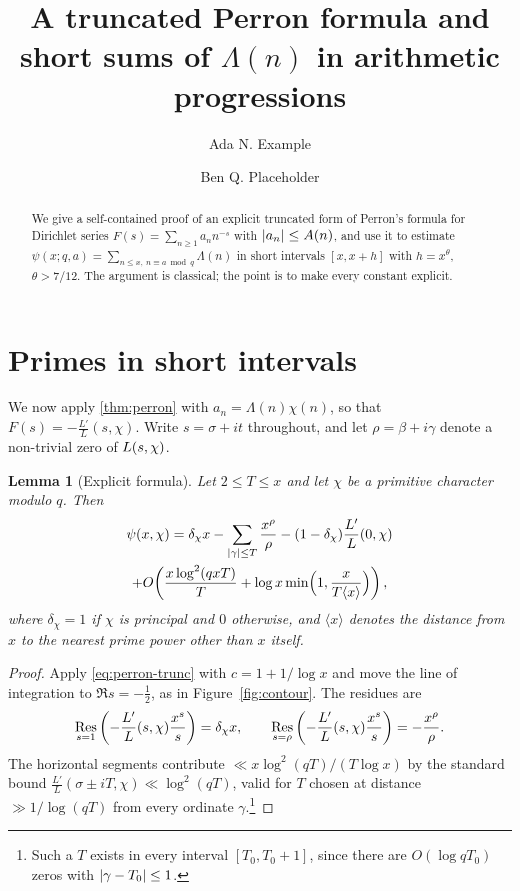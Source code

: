 \documentclass[11pt]{amsart}
\title[Truncated Perron formulae]{A truncated Perron formula and \\ short sums of $\Lambda(n)$ in arithmetic progressions}
\author{Ada N. Example}
\author{Ben Q. Placeholder}
\numberwithin{equation}{section}
\theoremstyle{plain}
\newtheorem{lemma}[theorem]{Lemma}
\theoremstyle{definition}
\theoremstyle{remark}
\begin{document}
\begin{abstract}
We give a self-contained proof of an explicit truncated form of Perron's formula
for Dirichlet series $F(s)=\sum_{n\ge1}a_n n^{-s}$ with $\lvert a_n\rvert\le A(n)$, and use it to
estimate $\psi(x;q,a)=\sum_{n\le x,\ n\equiv a \bmod q}\Lambda(n)$ in short intervals
$[x, x+h]$ with $h = x^{\theta}$, $\theta>7/12$. The argument is classical; the point is to make
every constant explicit.
\end{abstract}

\maketitle




\section{Primes in short intervals}\label{sec:short}

We now apply \cref{thm:perron} with $a_n=\Lambda(n)\chi(n)$, so that
$F(s)=-\frac{L'}{L}(s,\chi)$. Write $s=\sigma+it$ throughout, and let $\rho=\beta+i\gamma$
denote a non-trivial zero of $L(s,\chi)$.

\begin{lemma}[Explicit formula]\label{lem:explicit}
Let $2\le T\le x$ and let $\chi$ be a primitive character modulo $q$. Then
\begin{multline}\label{eq:explicit}
\psi(x,\chi) = \delta_\chi x - \sum_{\lvert\gamma\rvert\le T}\frac{x^{\rho}}{\rho}
 - (1-\delta_\chi)\frac{L'}{L}(0,\chi) \\
 + O\!\left(\frac{x\log^2(qxT)}{T} + \log x \min\Bigl(1, \frac{x}{T\langle x\rangle}\Bigr)\right),
\end{multline}
where $\delta_\chi=1$ if $\chi$ is principal and $0$ otherwise, and $\langle x\rangle$
denotes the distance from $x$ to the nearest prime power other than $x$ itself.
\end{lemma}

\begin{proof}
Apply \eqref{eq:perron-trunc} with $c = 1+1/\log x$ and move the line of integration to
$\Re s=-\tfrac12$, as in Figure~\ref{fig:contour}. The residues are
\begin{equation}
\operatorname*{Res}_{s=1}\left(-\frac{L'}{L}(s,\chi)\frac{x^s}{s}\right) = \delta_\chi x,
\qquad
\operatorname*{Res}_{s=\rho}\left(-\frac{L'}{L}(s,\chi)\frac{x^s}{s}\right) = -\frac{x^\rho}{\rho}.
\end{equation}
The horizontal segments contribute $\ll x\log^2(qT)/(T\log x)$ by the standard bound
$\frac{L'}{L}(\sigma\pm iT,\chi)\ll\log^2(qT)$, valid for $T$ chosen at distance
$\gg 1/\log(qT)$ from every ordinate $\gamma$.\footnote{Such a $T$ exists in every interval
$[T_0,T_0+1]$, since there are $O(\log qT_0)$ zeros with $\lvert\gamma-T_0\rvert\le1$.}
\end{proof}
\end{document}
